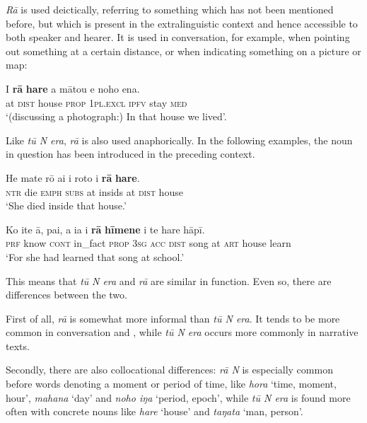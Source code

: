\textit{Rā} is used deictically, referring to something which has not been mentioned before, but which is present in the extralinguistic context and hence accessible to both speaker and hearer. It is used in conversation, for example, when pointing out something at a certain distance, or when indicating something on a picture or map:

\ea\label{ex:4.215}
\gll {\ꞌ}I \textbf{rā} \textbf{hare} a mātou e noho ena. \\
at \textsc{dist} house \textsc{prop} \textsc{1pl.excl} \textsc{ipfv} stay \textsc{med} \\

\glt
‘(discussing a photograph:) In that house we lived’. \textstyleExampleref{[R416.961]} 
\z

Like \textit{tū N era}, \textit{rā} is also used anaphorically. In the following examples, the noun in question has been introduced in the preceding context. 

\ea\label{ex:4.216}
\gll He mate rō {\ꞌ}ai {\ꞌ}i roto {\ꞌ}i \textbf{rā} \textbf{hare}. \\
\textsc{ntr} die \textsc{emph} \textsc{subs} at insids at \textsc{dist} house \\

\glt 
‘She died inside that house.’ \textstyleExampleref{[R532-14.034]}
\z

\ea\label{ex:4.217}
\gll Ko {\ꞌ}ite {\ꞌ}ā, pa{\ꞌ}i, a ia i \textbf{rā} \textbf{hīmene} {\ꞌ}i te hare hāpī. \\
\textsc{prf} know \textsc{cont} in\_fact \textsc{prop} \textsc{3sg} \textsc{acc} \textsc{dist} song at \textsc{art} house learn \\

\glt
‘For she had learned that song at school.’ \textstyleExampleref{[R334.341]} 
\z

This means that \textit{tū} \textit{N era} and \textit{rā} are similar in function. Even so, there are differences between the two. 

First of all, \textit{rā} is somewhat more informal than \textit{tū N era}. It tends to be more common in conversation and , while \textit{tū N era} occurs more commonly in narrative texts.

Secondly, there are also collocational differences: \textit{rā N} is especially common before words denoting a moment or period of time, like \textit{hora} ‘time, moment, hour’, \textit{mahana} ‘day’ and \textit{noho iŋa} ‘period, epoch’, while \textit{tū N era} is found more often with concrete nouns like \textit{hare} ‘house’ and \textit{taŋata} ‘man, person’. 

